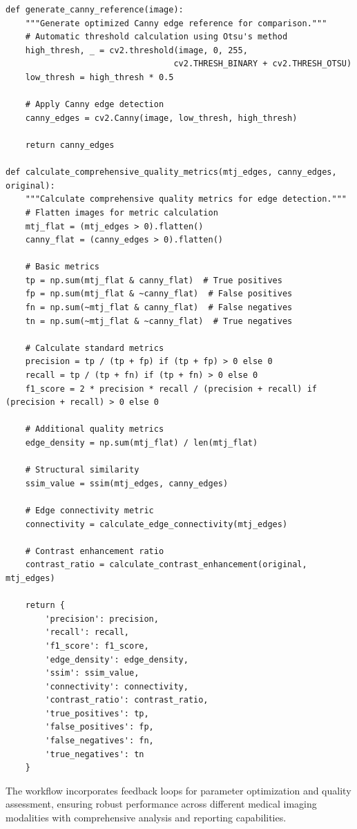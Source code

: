\documentclass[conference]{IEEEtran}
\begin{document}
{{\begin{lstlisting}[caption={Complete workflow management system}]
def generate_canny_reference(image):
    """Generate optimized Canny edge reference for comparison."""
    # Automatic threshold calculation using Otsu's method
    high_thresh, _ = cv2.threshold(image, 0, 255, 
                                  cv2.THRESH_BINARY + cv2.THRESH_OTSU)
    low_thresh = high_thresh * 0.5
    
    # Apply Canny edge detection
    canny_edges = cv2.Canny(image, low_thresh, high_thresh)
    
    return canny_edges

def calculate_comprehensive_quality_metrics(mtj_edges, canny_edges, original):
    """Calculate comprehensive quality metrics for edge detection."""
    # Flatten images for metric calculation
    mtj_flat = (mtj_edges > 0).flatten()
    canny_flat = (canny_edges > 0).flatten()
    
    # Basic metrics
    tp = np.sum(mtj_flat & canny_flat)  # True positives
    fp = np.sum(mtj_flat & ~canny_flat)  # False positives
    fn = np.sum(~mtj_flat & canny_flat)  # False negatives
    tn = np.sum(~mtj_flat & ~canny_flat)  # True negatives
    
    # Calculate standard metrics
    precision = tp / (tp + fp) if (tp + fp) > 0 else 0
    recall = tp / (tp + fn) if (tp + fn) > 0 else 0
    f1_score = 2 * precision * recall / (precision + recall) if (precision + recall) > 0 else 0
    
    # Additional quality metrics
    edge_density = np.sum(mtj_flat) / len(mtj_flat)
    
    # Structural similarity
    ssim_value = ssim(mtj_edges, canny_edges)
    
    # Edge connectivity metric
    connectivity = calculate_edge_connectivity(mtj_edges)
    
    # Contrast enhancement ratio
    contrast_ratio = calculate_contrast_enhancement(original, mtj_edges)
    
    return {
        'precision': precision,
        'recall': recall,
        'f1_score': f1_score,
        'edge_density': edge_density,
        'ssim': ssim_value,
        'connectivity': connectivity,
        'contrast_ratio': contrast_ratio,
        'true_positives': tp,
        'false_positives': fp,
        'false_negatives': fn,
        'true_negatives': tn
    }
\end{lstlisting}

The workflow incorporates feedback loops for parameter optimization and quality assessment, ensuring robust performance across different medical imaging modalities with comprehensive analysis and reporting capabilities.

}}
\end{document}
